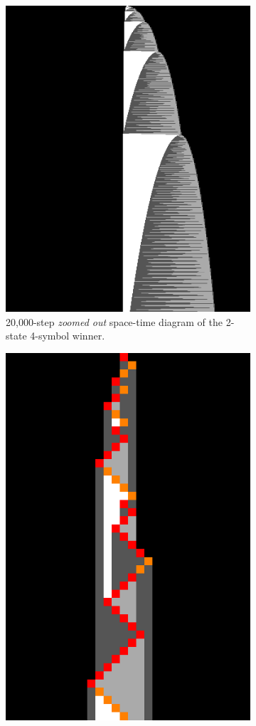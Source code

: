 \begin{figure}[h!]
\begin{subfigure}[t]{0.45\textwidth}
        \vspace{10pt} %
        \includegraphics[width=0.7\linewidth]{figures/space-time-diagrams/bb2x4_20k.png} %
        \caption{20,000-step \textit{zoomed out} space-time diagram of the 2-state 4-symbol winner.}\label{fig:bb2x4-diagram-zoomout}
    \end{subfigure}
    \hfill
    \begin{subfigure}[t]{0.45\textwidth}
        \centering
        \vspace{10pt} %
        \includegraphics[width=0.7\linewidth]{figures/space-time-diagrams/bb2x4.pdf}

\end{subfigure}
\end{figure}
